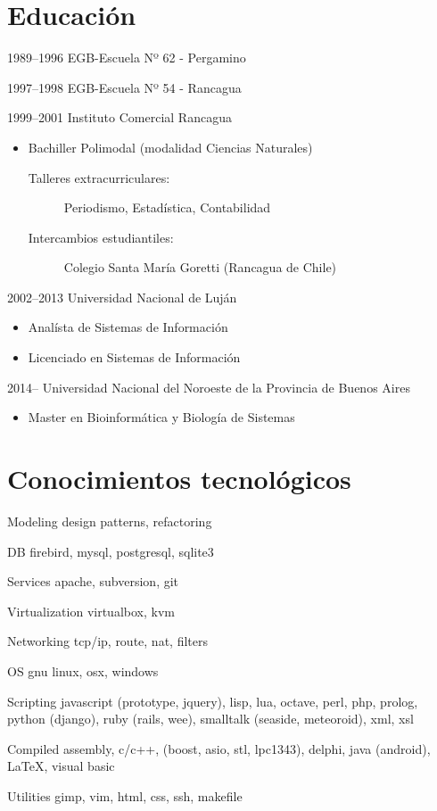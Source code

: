 \documentclass[a4paper]{article}
\begin{document}
\section{Educación}
\begin{CV}
\item[1989--1996] EGB-Escuela Nº 62 - Pergamino
\item[1997--1998] EGB-Escuela Nº 54 - Rancagua
\item[1999--2001] Instituto Comercial Rancagua
  \begin{itemize}
  \item Bachiller Polimodal (modalidad Ciencias Naturales)
  	\begin{description}
  	\item[Talleres extracurriculares: ] Periodismo, Estadística, Contabilidad
  	\item[Intercambios estudiantiles: ] Colegio Santa María Goretti (Rancagua de Chile)
  	\end{description}
  \end{itemize}
\item[2002--2013] Universidad Nacional de Luján
  \begin{itemize}
  \item Analísta de Sistemas de Información
  \item Licenciado en Sistemas de Información
  \end{itemize}
\item[2014--    ] Universidad Nacional del Noroeste de la Provincia de Buenos Aires
  \begin{itemize}
  \item Master en Bioinformática y Biología de Sistemas
  \end{itemize}
\end{CV}

\section{Conocimientos tecnológicos}
\begin{CV}
\item[Modeling] design patterns, refactoring
\item[DB] firebird, mysql, postgresql, sqlite3
\item[Services] apache, subversion, git
\item[Virtualization] virtualbox, kvm
\item[Networking] tcp/ip, route, nat, filters
\item[OS] gnu linux, osx, windows
\item[Scripting] javascript (prototype, jquery), lisp, lua, octave, perl, php, prolog, python (django), ruby (rails, wee), smalltalk (seaside, meteoroid), xml, xsl
\item[Compiled] assembly, c/c++, (boost, asio, stl, lpc1343), delphi, java (android), \LaTeX, visual basic
\item[Utilities] gimp, vim, html, css, ssh, makefile
\end{CV}
\end{document}
